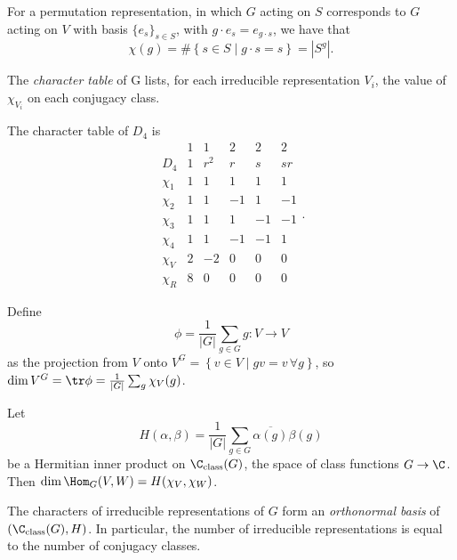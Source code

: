 \documentclass{notes}
\begin{document}
\begin{fact}
    For a permutation representation, in which $G$ acting on $S$ corresponds to $G$ acting on $V$ with basis $\{{e}_{s}\}_{s \in S}$, with $g\cdot e_s=e_{g\cdot s}$, we have that
    \[
        \chi(g)=\#\left\{ s \in S\mid  g\cdot s=s \right\} =\left| S^g \right| 
    .\] 
\end{fact}

\begin{defn}
    The \emph{character table} of G lists, for each irreducible representation  $V_i$, the value of $\chi _{V_i}$ on each conjugacy class.
\end{defn}

\begin{example}
    The character table of $D_4$ is
    \[
    \begin{array}{c|ccccc}
    & 1 & 1 & 2 & 2 & 2 \\
    D_4 & 1 & r^2 & r & s & sr \\\hline
    \chi_1 & 1 & 1 & 1 & 1 & 1 \\
    \chi_2 & 1 & 1 & -1 & 1 & -1 \\
    \chi_3 & 1 & 1 & 1 & -1 & -1 \\
    \chi_4 & 1 & 1 & -1 & -1 & 1 \\
    \chi_V & 2 & -2 & 0 & 0 & 0 \\\hline
    \chi_R & 8 & 0 & 0 & 0 & 0
    \end{array}
    .\] 
\end{example}

\begin{theorem}
    Define
    \[
    \phi =\frac{1}{|G|}\sum _{g\in G}g\colon V \to V 
    \]
    as the projection from $V$ onto $V^G=\left\{ v\in V\mid  gv=v\,\forall g \right\} $, so $\dim V^G=\tr \phi=\frac{1}{|G|}\sum _{g}\chi _V(g)$.
\end{theorem}

\begin{theorem}
    Let
    \[
        H(\alpha,\beta)=\frac{1}{|G|}\sum _{g\in G}\overline{\alpha(g)}\beta(g)
    \]
    be a Hermitian inner product on $\C _{\text{class}}(G)$, the space of class functions $G\to \C $. Then $\dim \Hom _G(V,W)=H(\chi _V,\chi _W)$.
\end{theorem}

\begin{theorem}
    The characters of irreducible representations of $G$ form an \emph{orthonormal basis} of $(\C _{\text{class}}(G),H)$. In particular, the number of irreducible representations is equal to the number of conjugacy classes.
\end{theorem}
\end{document}
